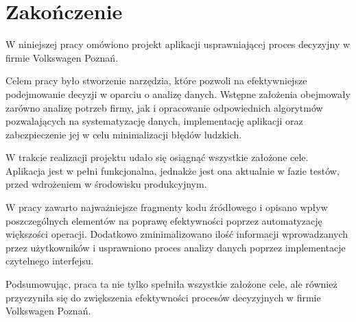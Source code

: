 \chapter{Zakończenie}

W niniejszej pracy omówiono projekt aplikacji usprawniającej proces decyzyjny w firmie Volkswagen Poznań. 

Celem pracy było stworzenie narzędzia, które pozwoli na efektywniejsze podejmowanie decyzji w oparciu o analizę danych. Wstępne założenia obejmowały zarówno analizę potrzeb firmy, jak i opracowanie odpowiednich algorytmów pozwalających na systematyzację danych, implementację aplikacji oraz zabezpieczenie jej w celu minimalizacji błędów ludzkich.

W trakcie realizacji projektu udało się osiągnąć wszystkie założone cele. Aplikacja jest w pełni funkcjonalna, jednakże jest ona aktualnie w fazie testów, przed wdrożeniem w środowisku produkcyjnym.

W pracy zawarto najważniejsze fragmenty kodu źródłowego i opisano wpływ poszczególnych elementów na poprawę efektywności poprzez automatyzację większości operacji. Dodatkowo zminimalizowano ilość informacji wprowadzanych przez użytkowników i usprawniono proces analizy danych poprzez implementacje czytelnego interfejsu.

Podsumowując, praca ta nie tylko spełniła wszystkie założone cele, ale również przyczyniła się do zwiększenia efektywności procesów decyzyjnych w firmie Volkswagen Poznań. 